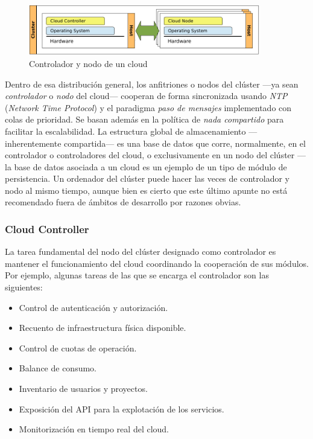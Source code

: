 \begin{figure}[tbp]
\begin{center}
\includegraphics[width=0.9\textwidth]{imagenes/004.pdf}
 \caption{Controlador y nodo de un cloud}
\label{fig:archcloud}
\end{center}
\end{figure}

Dentro de esa distribuci\'on general, los anfitriones o nodos del cl\'uster ---ya sean \emph{controlador} o \emph{nodo} del cloud--- cooperan de forma sincronizada usando \emph{NTP} (\emph{Network Time Protocol}) y el paradigma \emph{paso de mensajes} implementado con colas de prioridad. Se basan adem\'as en la pol\'itica de \emph{nada compartido} para facilitar la escalabilidad. La estructura global de almacenamiento ---inherentemente compartida--- es una base de datos que corre, normalmente, en el controlador o controladores del cloud, o exclusivamente en un nodo del cl\'uster ---la base de datos asociada a un cloud es un ejemplo de un tipo de m\'odulo de persistencia. Un ordenador del cl\'uster puede hacer las veces de controlador y nodo al mismo tiempo, aunque bien es cierto que este \'ultimo apunte no est\'a recomendado fuera de \'ambitos de desarrollo por razones obvias.


\subsubsection{Cloud Controller}\label{subsubsec:cloudcontroller}
\noindent La tarea fundamental del nodo del cl\'uster designado como controlador es mantener el funcionamiento del cloud coordinando la cooperaci\'on de sus m\'odulos. Por ejemplo, algunas tareas de las que se encarga el controlador son las siguientes:

\begin{itemize}
 \item Control de autenticaci\'on y autorizaci\'on.
 \item Recuento de infraestructura f\'isica disponible.
 \item Control de cuotas de operaci\'on.
 \item Balance de consumo.
 \item Inventario de usuarios y proyectos.
 \item Exposici\'on del API para la explotaci\'on de los servicios.
 \item Monitorizaci\'on en tiempo real del cloud.
\end{itemize}
 
